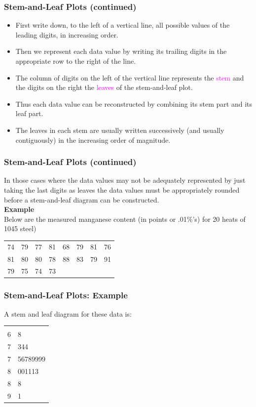 \documentclass[xcolor=dvipsnames,12pt]{beamer}
\begin{document}
\begin{frame}
\frametitle{Stem-and-Leaf Plots (continued)} 
\begin{itemize}
\item First write down, to the left of a vertical line, all possible 
values of the leading digits, in increasing order.  
\item Then we represent each data value by writing its trailing digits 
in the appropriate row to the right of the line. 
\item The column of digits on the left of the vertical
line represents the \textcolor{magenta}{stem} and the digits on the right 
the \textcolor{magenta}{leaves} of the stem-and-leaf plot.
\item Thus each data value can be 
reconstructed by combining its stem part and its leaf part. 
\item The leaves in each stem are usually written successively
(and usually contiguously) in the increasing order of magnitude. 
\end{itemize}
\end{frame}

\begin{frame}
\frametitle{Stem-and-Leaf Plots (continued)} 
In those cases where the data values may not be adequately represented by just
taking the last digits as leaves the data values must be
appropriately rounded before a stem-and-leaf diagram can be
constructed.\\
\noindent \textbf{Example}\\[.1in]
Below are the measured manganese content (in points or .01\%'s) for 20 heats of 1045 steel)
\begin{center}
\begin{tabular}{rrrrrrrr}
                             74 &  79 &  77 &  81 & 68 &  79 &  81 &  76\\
                             81 &  80 &  80 &  78 & 88 &  83 &  79 &  91\\
                             79 &  75 &  74 &  73
\end{tabular}
\end{center}
\end{frame}



\begin{frame}
\frametitle{Stem-and-Leaf Plots: Example}
A stem and leaf diagram for these data is:\\
\begin{center}
\begin{tabular}{r|l}
                                    & \\
                                  6 & 8\\
                                  7 & 344\\
                                  7 & 56789999\\
                                  8 & 001113\\
                                  8 & 8\\
                                  9 & 1
\end{tabular}
\end{center}
\end{frame}
\end{document}
